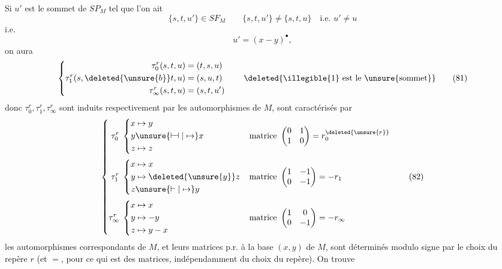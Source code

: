 Si $u'$ est le sommet de $SP_M$ tel que l'on ait
\[
\{s,t,u'\}\in SF_M \qquad \{s,t,u'\}\ne\{s,t,u\}\quad\text{i.e. }u'\ne u
\]
i.e.
\[
u'=(x-y)^{\bullet},\tag*{(81)}
\]
on aura
\[
\left\{\begin{aligned}
\tau_0^r(s,t,u)&=(t,s,u)\\
\tau_1^r(s,\deleted{\unsure{b}}t,u)&=(s,u,t)\\
\tau_\infty^r(s,t,u)&=(s,t,u')
\end{aligned}\right.
\qquad\text{\deleted{\illegible{1} est le \unsure{sommet}}}\tag*{(81)}
\]
donc $\tau_0^r,\tau_1^r,\tau_\infty^r$ sont induits respectivement par les automorphismes  de $M$,   sont caractérisés par
\[
\left\{\begin{aligned}
\tau_0^r\;&\left\{\begin{aligned}x&\mapsto y\\y&\unsure{\vdash\!\dashv|\mapsto}x\\z&\mapsto z\end{aligned}\right.
&&\text{matrice }\begin{pmatrix}0&1\\1&0\end{pmatrix}=r_0^{\deleted{\unsure{r}}}\\[3pt]
\tau_1^r\;&\left\{\begin{aligned}x&\mapsto x\\y&\mapsto \deleted{\unsure{y}}z\\z&\unsure{\vdash|\mapsto}y\end{aligned}\right.
&&\text{matrice }\begin{pmatrix}1&-1\\0&-1\end{pmatrix}=-r_1\\[3pt]
\tau_\infty^r\;&\left\{\begin{aligned}x&\mapsto x\\y&\mapsto-y\\z&\mapsto y-x\end{aligned}\right.
&&\text{matrice }\begin{pmatrix}1&0\\0&-1\end{pmatrix}=-r_\infty
\end{aligned}\right.\tag*{(82)}
\]
les automorphismes correspondants de $M$, et leurs matrices p.r. à la base $(x,y)$ de $M$, sont déterminés modulo signe par le choix du repère $r$ (et $=$, pour ce qui est des matrices, indépendamment du choix du repère). On trouve
